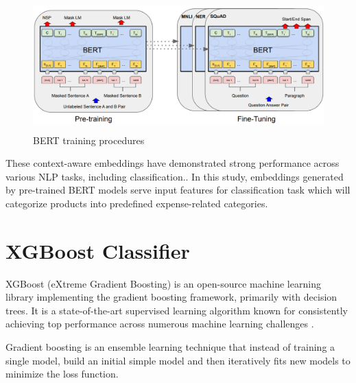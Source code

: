 \documentclass{SGGW-thesis-EN}
\begin{document}
\begin{figure}[h!]
  \centering
    \includegraphics[height=5cm]{images/bert_procedures.png}
    \caption{BERT training procedures \cite{devlin2019bertpretrainingdeepbidirectional}}
    \label{fig:bert_procedures}
  \end{figure}

These context-aware embeddings have demonstrated strong performance across various NLP tasks, including classification.\cite{devlin2019bertpretrainingdeepbidirectional}.
In this study, embeddings generated by pre-trained BERT models serve input features for classification task which will categorize products into predefined expense-related categories.


\section{XGBoost Classifier}
XGBoost (eXtreme Gradient Boosting) is an open-source machine learning library implementing the gradient boosting framework, 
primarily with decision trees. It is a state-of-the-art supervised learning algorithm known for consistently achieving top performance across numerous machine learning challenges \cite{Chen_2016}.

Gradient boosting is an ensemble learning technique that instead of training a single model, build an initial simple model 
and then iteratively fits new models to  minimize the loss function\cite{natekin2013gradient}.
\end{document}
